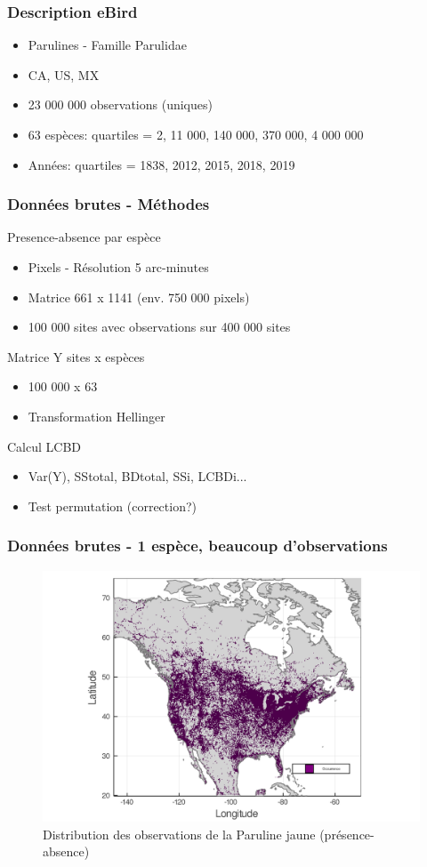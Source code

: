 \documentclass[10pt]{beamer}
\begin{document}
\begin{frame}
  \frametitle{Description eBird}
  \begin{itemize}
    \item Parulines - Famille Parulidae
    \item CA, US, MX
    \item 23 000 000 observations (uniques)
    \item 63 espèces: quartiles = 2, 11 000, 140 000, 370 000, 4 000 000
    \item Années: quartiles = 1838, 2012, 2015, 2018, 2019
  \end{itemize}
\end{frame}

\begin{frame}
  \frametitle{Données brutes - Méthodes}
  Presence-absence par espèce
  \begin{itemize}
    \item Pixels - Résolution 5 arc-minutes
    \item Matrice 661 x 1141 (env. 750 000 pixels)
    \item 100 000 sites avec observations sur 400 000 sites
  \end{itemize}
  \medskip
  Matrice Y sites x espèces
  \begin{itemize}
    \item 100 000 x 63
    \item Transformation Hellinger
  \end{itemize}
  \medskip
  Calcul LCBD
  \begin{itemize}
    \item Var(Y), SStotal, BDtotal, SSi, LCBDi...
    \item Test permutation (correction?)
  \end{itemize}
\end{frame}

\begin{frame}
  \frametitle{Données brutes - 1 espèce, beaucoup d'observations}
  \begin{figure}
    \centering
    \hspace*{-0cm}\includegraphics[scale=0.17]{fig/01_raw_singlesp.png}
    \caption{Distribution des observations de la Paruline jaune (présence-absence)}
  \end{figure}
\end{frame}
\end{document}
